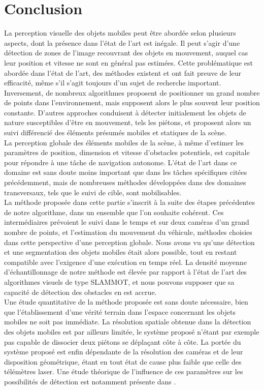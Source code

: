 \section{Conclusion}
La perception visuelle des objets mobiles peut être abordée selon plusieurs aspects, dont la présence dans l'état de l'art est inégale. Il peut s'agir d'une détection de zones de l'image recouvrant des objets en mouvement, auquel cas leur position et vitesse ne sont en général pas estimées. Cette problématique est abordée dans l'état de l'art, des méthodes existent et ont fait preuve de leur efficacité, même s'il s'agit toujours d'un sujet de recherche important. Inversement, de nombreux algorithmes proposent de positionner un grand nombre de points dans l'environnement, mais supposent alors le plus souvent leur position constante. D'autres approches conduisent à détecter initialement les objets de nature susceptibles d'être en mouvement, tels les piétons, et proposent alors un suivi différencié des éléments présumés mobiles et statiques de la scène. \\

La perception globale des éléments mobiles de la scène, à même d'estimer les paramètres de position, dimension et vitesse d'obstacles potentiels, est capitale pour répondre à une tâche de navigation autonome. L'état de l'art dans ce domaine est sans doute moins important que dans les tâches spécifiques citées précédemment, mais de nombreuses méthodes développées dans des domaines transversaux, tels que le suivi de cible, sont mobilisables.\\
La méthode proposée dans cette partie s'inscrit à la suite des étapes précédentes de notre algorithme, dans un ensemble que l'on souhaite cohérent. Ces intermédiaires prévoient le suivi dans le temps et sur deux caméras d'un grand nombre de points, et l'estimation du mouvement du véhicule, méthodes choisies dans cette perspective d'une perception globale. Nous avons vu qu'une détection et une segmentation des objets mobiles était alors possible, tout en restant compatible avec l'exigence d'une exécution en temps réel. La densité moyenne d'échantillonnage de notre méthode est élevée par rapport à l'état de l'art des algorithmes visuels de type SLAMMOT, et nous pouvons supposer que sa capacité de détection des obstacles en est accrue.\\
Une étude quantitative de la méthode proposée est sans doute nécessaire, bien que l'établissement d'une vérité terrain dans l'espace concernant les objets mobiles ne soit pas immédiate. La résolution spatiale obtenue dans la détection des objets mobiles est par ailleurs limitée, le système proposé n'étant par exemple pas capable de dissocier deux piétons se déplaçant côte à côte. La portée du système proposé est enfin dépendante de la résolution des caméras et de leur disposition géométrique, étant en tout état de cause plus faible que celle des télémètres laser. Une étude théorique de l'influence de ces paramètres sur les possibilités de détection est notamment présente dans \cite{Bak2011}.

